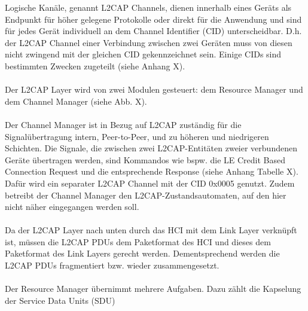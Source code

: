 Logische Kanäle, genannt L2CAP Channels, dienen innerhalb eines Geräts als Endpunkt für höher gelegene Protokolle oder direkt für die Anwendung und sind für jedes Gerät individuell an dem Channel Identifier (CID) unterscheidbar. D.h. der L2CAP Channel einer Verbindung zwischen zwei Geräten muss von diesen nicht zwingend mit der gleichen CID gekennzeichnet sein. Einige CIDs sind bestimmten Zwecken zugeteilt (siehe Anhang X).
\\\\
Der L2CAP Layer wird von zwei Modulen gesteuert: dem Resource Manager und dem Channel Manager (siehe Abb. X).
\\\\
Der Channel Manager ist in Bezug auf L2CAP zuständig für die Signalübertragung intern, Peer-to-Peer, und zu höheren und niedrigeren Schichten.
Die Signale, die zwischen zwei L2CAP-Entitäten zweier verbundenen Geräte übertragen werden, sind Kommandos wie bspw. die LE Credit Based Connection Request und die entsprechende Response (siehe Anhang Tabelle X). 
Dafür wird ein separater L2CAP Channel mit der CID 0x0005 genutzt. Zudem betreibt der Channel Manager den L2CAP-Zustandsautomaten, auf den hier nicht näher eingegangen werden soll.
\\\\
Da der L2CAP Layer nach unten durch das HCI mit dem Link Layer verknüpft ist, müssen die L2CAP PDUs dem Paketformat des HCI und dieses dem Paketformat des Link Layers gerecht werden. Dementsprechend werden die L2CAP PDUs fragmentiert bzw. wieder zusammengesetzt.
\\\\
Der Resource Manager übernimmt mehrere Aufgaben. Dazu zählt die Kapselung der Service Data Units (SDU)





